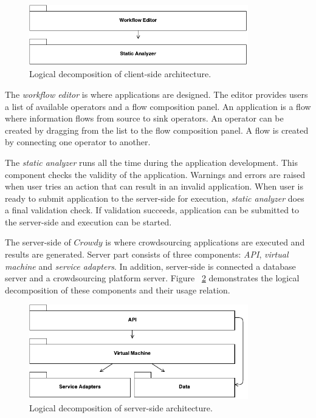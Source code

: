 \begin{figure}[ht]
	\centering
	\includegraphics[width=0.85\textwidth]{figures/architecture/ClientDecomposition.pdf}
	\caption{Logical decomposition of client-side architecture.}
	\label{fig:clientdecomposition}
\end{figure}

The \textit{workflow editor} is where applications are designed. The editor provides 
users a list of available operators and a flow composition panel. An application is 
a flow where information flows from source to sink operators. An operator can be 
created by dragging from the list to the flow composition panel. A flow is created by 
connecting one operator to another.

The \textit{static analyzer} runs all the time during the application development. This 
component checks the validity of the application. Warnings and errors are raised 
when user tries an action that can result in an invalid application. When user is 
ready to submit application to the server-side for execution, \textit{static analyzer} 
does a final validation check. If validation succeeds, application can be submitted 
to the server-side and execution can be started.

The server-side of $Crowdy$ is where crowdsourcing applications are executed and 
results are generated. Server part consists of three components: \textit{API}, 
\textit{virtual machine} and \textit{service adapters}. In addition, server-side 
is connected a database server and a crowdsourcing platform server. Figure
~\ref{fig:serverdecomposition} demonstrates the logical decomposition of these 
components and their usage relation.

\begin{figure}[ht]
	\centering
	\includegraphics[width=0.85\textwidth]{figures/architecture/ServerDecomposition.pdf}
	\caption{Logical decomposition of server-side architecture.}
	\label{fig:serverdecomposition}
\end{figure}

